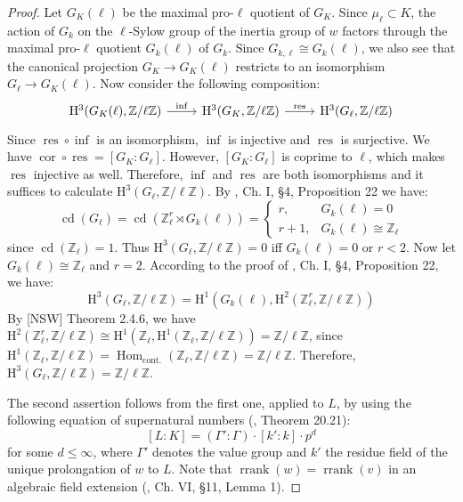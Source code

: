 \begin{proof}
Let $G_K(\ell)$ be the maximal pro-$\ell$ quotient of $G_K$. Since $\mu_\ell\subset K$, the action of $G_k$ on the $\ell$-Sylow group of the inertia group of $w$ factors through the maximal pro-$\ell$ quotient $G_k(\ell)$ of $G_k$. Since $G_{k,\ell}\cong G_k(\ell)$, we also see that the canonical projection $G_K\to G_K(\ell)$ restricts to an isomorphism $G_\ell\to G_K(\ell)$. Now consider the following composition:
\[ \begin{tikzcd}
\mathrm{H}^3(G_K(\ell),\mathbb{Z}/\ell\mathbb{Z}) \ar[r, "\operatorname{inf}"] & \mathrm{H}^3(G_K,\mathbb{Z}/\ell\mathbb{Z}) \ar[r, "\operatorname{res}"] & \mathrm{H}^3(G_\ell,\mathbb{Z}/\ell\mathbb{Z})
\end{tikzcd} \]
Since $\operatorname{res}\circ\operatorname{inf}$ is an isomorphism, $\operatorname{inf}$ is injective and $\operatorname{res}$ is surjective. We have $\operatorname{cor}\circ\operatorname{res} = [G_K:G_\ell]$. However, $[G_K:G_\ell]$ is coprime to $\ell$, which makes $\operatorname{res}$ injective as well. Therefore, $\operatorname{inf}$ and $\operatorname{res}$ are both isomorphisms and it suffices to calculate $\mathrm{H}^3(G_\ell,\mathbb{Z}/\ell\mathbb{Z})$. By \cite{Se64}, Ch. I, §4, Proposition 22 we have:
\[\operatorname{cd}(G_\ell) = \operatorname{cd}(\mathbb{Z}_\ell^r\rtimes G_k(\ell)) = \begin{cases}
r, & G_k(\ell) = 0 \\
r + 1, & G_k(\ell)\cong\mathbb{Z}_\ell
\end{cases} \] 
since $\operatorname{cd}(\mathbb{Z}_\ell)=1$. Thus $\mathrm{H}^3(G_\ell, \mathbb{Z}/\ell\mathbb{Z}) =0$ iff $G_k(\ell) = 0$ or $r < 2$. Now let $G_k(\ell) \cong\mathbb{Z}_\ell$ and $r = 2$. According to the proof of \cite{Se64}, Ch. I, §4, Proposition 22, we have:
\[ \mathrm{H}^3(G_\ell,\mathbb{Z}/\ell\mathbb{Z}) = \mathrm{H}^1(G_k(\ell), \mathrm{H}^2 (\mathbb{Z}_\ell^r, \mathbb{Z}/\ell\mathbb{Z})) \]
By [NSW] Theorem 2.4.6, we have $\mathrm{H}^2(\mathbb{Z}_\ell^r,\mathbb{Z}/\ell\mathbb{Z}) \cong\mathrm{H}^1(\mathbb{Z}_\ell, \mathrm{H}^1(\mathbb{Z}_\ell, \mathbb{Z}/\ell\mathbb{Z})) = \mathbb{Z}/\ell\mathbb{Z}$, since $\mathrm{H}^1(\mathbb{Z}_\ell, \mathbb{Z}/\ell\mathbb{Z})=\operatorname{Hom}_\text{cont.}(\mathbb{Z}_\ell, \mathbb{Z}/\ell\mathbb{Z})=\mathbb{Z}/\ell\mathbb{Z}$. Therefore, $\mathrm{H}^3(G_\ell,\mathbb{Z}/\ell\mathbb{Z})=\mathbb{Z}/\ell\mathbb{Z}$.

The second assertion follows from the first one, applied to $L$, by using the following equation of supernatural numbers (\cite{En72}, Theorem 20.21):
\[ [L:K] = (\Gamma':\Gamma) \cdot [k':k]\cdot p^d \]
for some $d \leq \infty$, where $\Gamma'$ denotes the value group and $k'$ the residue field of the unique prolongation of $w$ to $L$. Note that $\operatorname{rrank}(w) = \operatorname{rrank}(v)$ in an algebraic field extension (\cite{ZS60}, Ch. VI, §11, Lemma 1).
\end{proof}

